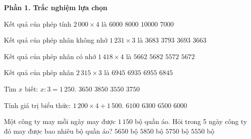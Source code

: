 \textbf{Phần 1. Trắc nghiệm lựa chọn}

\begin{ex} %
Kết quả của phép tính $2\,000 \times 4$ là
\choice
{$6000$}
{\True $8000$}
{$10000$}
{$7000$}
\end{ex}

\begin{ex} %
Kết quả của phép nhân không nhớ $1\,231 \times 3$ là
\choice
{$3683$}
{$3793$}
{\True $3693$}
{$3663$}
\end{ex}

\begin{ex} %
Kết quả của phép nhân có nhớ $1\,418 \times 4$ là
\choice
{$5662$}
{$5682$}
{$5572$}
{\True $5672$}
\end{ex}

\begin{ex} %
Kết quả của phép nhân $2\,315 \times 3$ là
\choice
{\True $6945$}
{$6935$}
{$6955$}
{$6845$}
\end{ex}

\begin{ex} %
Tìm $x$ biết: $x : 3 = 1\,250$.
\choice
{$3650$}
{$3850$}
{$3550$}
{\True $3750$}
\end{ex}

\begin{ex} %
Tính giá trị biểu thức: $1\,200 \times 4 + 1\,500$.
\choice
{$6100$}
{\True $6300$}
{$6500$}
{$6000$}
\end{ex}

\begin{ex} %
Một công ty may mỗi ngày may được $1\,150$ bộ quần áo. Hỏi trong 5 ngày công ty đó may được bao nhiêu bộ quần áo?
\choice
{$5650$ bộ}
{$5850$ bộ}
{\True $5750$ bộ}
{$5550$ bộ}
\end{ex}

